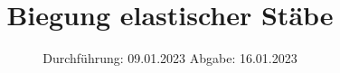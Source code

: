 

\subject{V103}
\title{%
Biegung elastischer Stäbe}
\date{%
  Durchführung: 09.01.2023
  \hspace{3em}
  Abgabe: 16.01.2023
}



\maketitle
\thispagestyle{empty}
\tableofcontents
\newpage






\printbibliography{}


